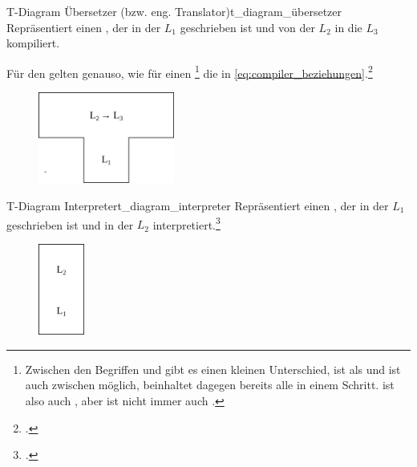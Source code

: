 \begin{Definition}{T-Diagram Übersetzer (bzw. eng. Translator)}{t_diagram_übersetzer}
  Repräsentiert einen , der in der  $L_1$ geschrieben ist und  von der  $L_2$ in die  $L_3$ kompiliert.

  Für den  gelten genauso, wie für einen \footnote{Zwischen den Begriffen  und  gibt es einen kleinen Unterschied,  ist  als  und ist auch zwischen  möglich,  beinhaltet dagegen bereits alle  in einem Schritt.  ist also auch , aber  ist nicht immer auch .} die  in \ref{eq:compiler_beziehungen}.\footcite{earley_formalism_1970}
  \begin{figure}[H]
    \centering
    \includegraphics[height=3cm]{./figures/uerbersetzer.png}
  \end{figure}
\end{Definition}

\begin{Definition}{T-Diagram Interpreter}{t_diagram_interpreter}
  Repräsentiert einen , der in der  $L_1$ geschrieben ist und  in der  $L_2$ interpretiert.\footcite{earley_formalism_1970}
  \begin{figure}[H]
    \centering
    \includegraphics[height=3cm]{./figures/interpreter.png}
  \end{figure}
\end{Definition}

